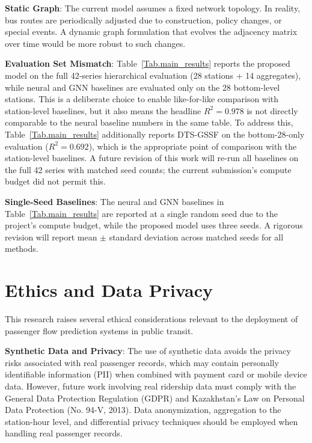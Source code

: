 \textbf{Static Graph}: The current model assumes a fixed network topology. In reality, bus routes are periodically adjusted due to construction, policy changes, or special events. A dynamic graph formulation that evolves the adjacency matrix over time would be more robust to such changes.

\textbf{Evaluation Set Mismatch}: Table~\ref{Tab.main_results} reports the proposed model on the full 42-series hierarchical evaluation (28 stations + 14 aggregates), while neural and GNN baselines are evaluated only on the 28 bottom-level stations. This is a deliberate choice to enable like-for-like comparison with station-level baselines, but it also means the headline $R^2 = 0.978$ is not directly comparable to the neural baseline numbers in the same table. To address this, Table~\ref{Tab.main_results} additionally reports DTS-GSSF on the bottom-28-only evaluation ($R^2 = 0.692$), which is the appropriate point of comparison with the station-level baselines. A future revision of this work will re-run all baselines on the full 42 series with matched seed counts; the current submission's compute budget did not permit this.

\textbf{Single-Seed Baselines}: The neural and GNN baselines in Table~\ref{Tab.main_results} are reported at a single random seed due to the project's compute budget, while the proposed model uses three seeds. A rigorous revision will report mean $\pm$ standard deviation across matched seeds for all methods.

\section{Ethics and Data Privacy}
\label{sec:ethics}

This research raises several ethical considerations relevant to the deployment of passenger flow prediction systems in public transit.

\textbf{Synthetic Data and Privacy}: The use of synthetic data avoids the privacy risks associated with real passenger records, which may contain personally identifiable information (PII) when combined with payment card or mobile device data. However, future work involving real ridership data must comply with the General Data Protection Regulation (GDPR) and Kazakhstan's Law on Personal Data Protection (No. 94-V, 2013). Data anonymization, aggregation to the station-hour level, and differential privacy techniques \cite{dwork2006calibrating,dwork2014algorithmic} should be employed when handling real passenger records.

